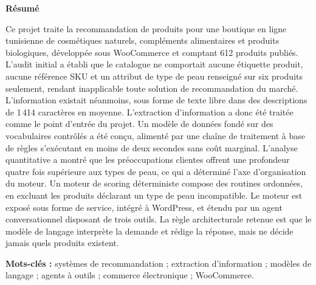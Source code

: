 \begin{center}
  {\Large\bfseries R\'esum\'e}
\end{center}
\vspace{0.6cm}

Ce projet traite la recommandation de produits pour une boutique en ligne
tunisienne de cosm\'etiques naturels, compl\'ements alimentaires et produits
biologiques, d\'evelopp\'ee sous WooCommerce et comptant 612 produits publi\'es.
L'audit initial a \'etabli que le catalogue ne comportait aucune \'etiquette
produit, aucune r\'ef\'erence SKU et un attribut de type de peau renseign\'e sur
six produits seulement, rendant inapplicable toute solution de recommandation du
march\'e. L'information existait n\'eanmoins, sous forme de texte libre dans des
descriptions de 1{\,}414 caract\`eres en moyenne. L'extraction d'information a
donc \'et\'e trait\'ee comme le point d'entr\'ee du projet. Un mod\`ele de
donn\'ees fond\'e sur des vocabulaires contr\^ol\'es a \'et\'e con\c{c}u, aliment\'e
par une cha\^ine de traitement \`a base de r\`egles s'ex\'ecutant en moins de deux
secondes sans co\^ut marginal. L'analyse quantitative a montr\'e que les
pr\'eoccupations clientes offrent une profondeur quatre fois sup\'erieure aux types
de peau, ce qui a d\'etermin\'e l'axe d'organisation du moteur. Un moteur de
scoring d\'eterministe compose des routines ordonn\'ees, en excluant les produits
d\'eclarant un type de peau incompatible. Le moteur est expos\'e sous forme de
service, int\'egr\'e \`a WordPress, et \'etendu par un agent conversationnel
disposant de trois outils. La r\`egle architecturale retenue est que le mod\`ele de
langage interpr\`ete la demande et r\'edige la r\'eponse, mais ne d\'ecide jamais
quels produits existent.

\vspace{0.8cm}
\noindent\textbf{Mots-cl\'es :} syst\`emes de recommandation ; extraction
d'information ; mod\`eles de langage ; agents \`a outils ; commerce \'electronique ;
WooCommerce.
